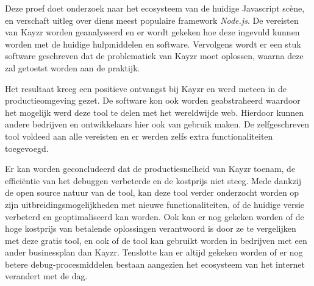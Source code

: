 Deze proef doet onderzoek naar het ecosysteem van de huidige Javascript scène, en verschaft uitleg over diens meest populaire framework \textit{Node.js}. De vereisten van Kayzr worden geanalyseerd en er wordt gekeken hoe deze ingevuld kunnen worden met de huidige hulpmiddelen en software. Vervolgens wordt er een stuk software geschreven dat de problematiek van Kayzr moet oplossen, waarna deze zal getoetst worden aan de praktijk.

 Het resultaat kreeg een positieve ontvangst bij Kayzr en werd meteen in de productieomgeving gezet. De software kon ook worden geabstraheerd waardoor het mogelijk werd deze tool te delen met het wereldwijde web. Hierdoor kunnen andere bedrijven en ontwikkelaars hier ook van gebruik maken. De zelfgeschreven tool voldeed aan alle vereisten en er werden zelfs extra functionaliteiten toegevoegd.
 
 Er kan worden geconcludeerd dat de productiesnelheid van Kayzr toenam, de efficiëntie van het debuggen verbeterde en de kostprijs niet steeg. Mede dankzij de open source natuur van de tool, kan deze tool verder onderzocht worden op zijn uitbreidingsmogelijkheden met nieuwe functionaliteiten, of de huidige versie verbeterd en geoptimaliseerd kan worden. Ook kan er nog gekeken worden of de hoge kostprijs van betalende oplossingen verantwoord is door ze te vergelijken met deze gratis tool, en ook of de tool kan gebruikt worden in bedrijven met een ander businessplan dan Kayzr. Tenslotte kan er altijd gekeken worden of er nog betere debug-procesmiddelen bestaan aangezien het ecosysteem van het internet verandert met de dag. 

